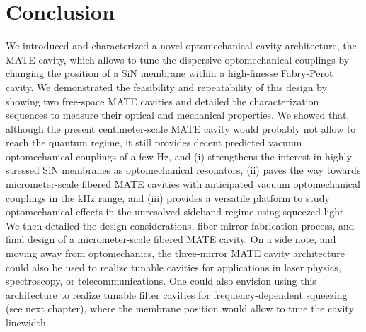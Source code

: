 \section{Conclusion}
We introduced and characterized a novel optomechanical cavity architecture, the MATE cavity, which allows to tune the dispersive optomechanical couplings by changing the position of a SiN membrane within a high-finesse Fabry-Perot cavity. We demonstrated the feasibility and repeatability of this design by showing two free-space MATE cavities and detailed the characterization sequences to measure their optical and mechanical properties. We showed that, although the present centimeter-scale MATE cavity would probably not allow to reach the quantum regime, it still provides decent predicted vacuum optomechanical couplings of a few Hz, and (i) strengthens the interest in highly-stressed SiN membranes as optomechanical resonators, (ii) paves the way towards micrometer-scale fibered MATE cavities with anticipated vacuum optomechanical couplings in the kHz range, and (iii) provides a versatile platform to study optomechanical effects in the unresolved sideband regime using squeezed light. We then detailed the design considerations, fiber mirror fabrication process, and final design of a micrometer-scale fibered MATE cavity. On a side note, and moving away from optomechanics, the three-mirror MATE cavity architecture could also be used to realize tunable cavities for applications in laser physics, spectroscopy, or telecommunications. One could also envision using this architecture to realize tunable filter cavities for frequency-dependent squeezing (see next chapter), where the membrane position would allow to tune the cavity linewidth. 
